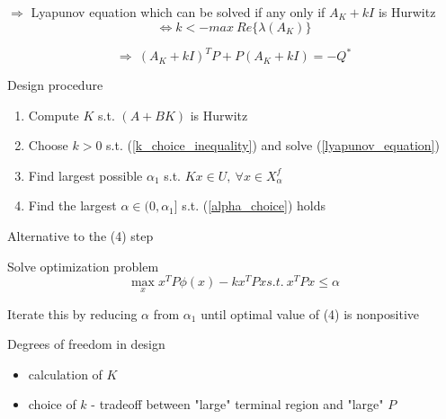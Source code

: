 $\Rightarrow$ Lyapunov equation which can be solved if any only if $A_K + kI$ is Hurwitz 
\begin{equation}\label{k_choice_inequality}
\Leftrightarrow k < - max\ Re \{ \lambda(A_K)\}
\end{equation}

\begin{equation}\label{lyapunov_equation}
\Rightarrow\ (A_K + kI)^TP + P(A_K + kI) = - Q^*
\end{equation}

Design procedure 
\begin{enumerate}
\item Compute $K$ s.t. $(A+BK)$ is Hurwitz 
\item Choose $k > 0$ s.t. (\ref{k_choice_inequality}) and solve (\ref{lyapunov_equation})
\item Find largest possible $\alpha_1$ s.t. $Kx \in U, \ \forall x \in X^f_{\alpha}$ 
\item Find the largest $\alpha \in (0,\alpha_1]$ s.t. (\ref{alpha_choice}) holds
\end{enumerate}

Alternative to the (4) step

Solve optimization problem 
\begin{equation}
\max_{x} x^TP\phi(x) - kx^TPx s.t. \ x^TPx \leq \alpha
\end{equation}

Iterate this by reducing $\alpha$ from $\alpha_1$ until optimal value of (4) is nonpositive

Degrees of freedom in design
\begin{itemize}
\item calculation of $K$
\item choice of $k$ - tradeoff between "large" terminal region and "large" $P$
\end{itemize}

